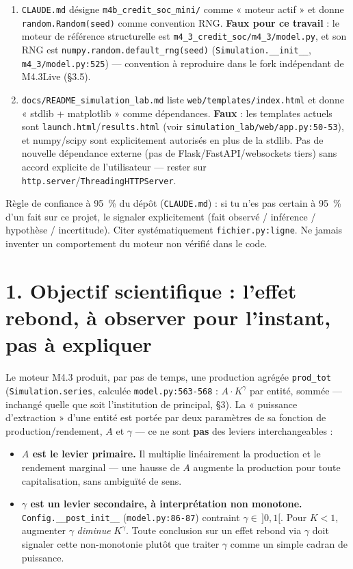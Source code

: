 \documentclass[11pt,a4paper]{article}
\newcommand{\code}[1]{\texttt{#1}}
\begin{document}
\begin{enumerate}
\item \code{CLAUDE.md} désigne \code{m4b\_credit\_soc\_mini/} comme
  « moteur actif » et donne \code{random.Random(seed)} comme convention
  RNG. \textbf{Faux pour ce travail} : le moteur de référence structurelle
  est \code{m4\_3\_credit\_soc/m4\_3/model.py}, et son RNG est
  \code{numpy.random.default\_rng(seed)} (\code{Simulation.\_\_init\_\_},
  \code{m4\_3/model.py:525}) --- convention à reproduire dans le fork
  indépendant de M4.3Live (\S3.5).
\item \code{docs/README\_simulation\_lab.md} liste
  \code{web/templates/index.html} et donne « stdlib + matplotlib » comme
  dépendances. \textbf{Faux} : les templates actuels sont
  \code{launch.html}/\code{results.html} (voir
  \code{simulation\_lab/web/app.py:50-53}), et numpy/scipy sont
  explicitement autorisés en plus de la stdlib. Pas de nouvelle
  dépendance externe (pas de Flask/FastAPI/websockets tiers) sans accord
  explicite de l'utilisateur --- rester sur
  \code{http.server}/\code{ThreadingHTTPServer}.
\end{enumerate}

Règle de confiance à 95~\% du dépôt (\code{CLAUDE.md}) : si tu n'es pas
certain à 95~\% d'un fait sur ce projet, le signaler explicitement (fait
observé / inférence / hypothèse / incertitude). Citer systématiquement
\code{fichier.py:ligne}. Ne jamais inventer un comportement du moteur non
vérifié dans le code.

\section*{1. Objectif scientifique : l'effet rebond, à observer pour l'instant, pas à expliquer}

Le moteur M4.3 produit, par pas de temps, une production agrégée
\code{prod\_tot} (\code{Simulation.series}, calculée \code{model.py:563-568}
: $A \cdot K^{\gamma}$ par entité, sommée --- inchangé quelle que soit
l'institution de principal, \S3). La « puissance d'extraction » d'une
entité est portée par deux paramètres de sa fonction de
production/rendement, $A$ et $\gamma$ --- ce ne sont \textbf{pas} des
leviers interchangeables :

\begin{itemize}
\item \textbf{$A$ est le levier primaire.} Il multiplie linéairement la
  production et le rendement marginal --- une hausse de $A$ augmente la
  production pour toute capitalisation, sans ambiguïté de sens.
\item \textbf{$\gamma$ est un levier secondaire, à interprétation non
  monotone.} \code{Config.\_\_post\_init\_\_} (\code{model.py:86-87})
  contraint $\gamma \in\, ]0,1[$. Pour $K<1$, augmenter $\gamma$
  \emph{diminue} $K^{\gamma}$. Toute conclusion sur un effet rebond via
  $\gamma$ doit signaler cette non-monotonie plutôt que traiter $\gamma$
  comme un simple cadran de puissance.
\end{itemize}
\end{document}

